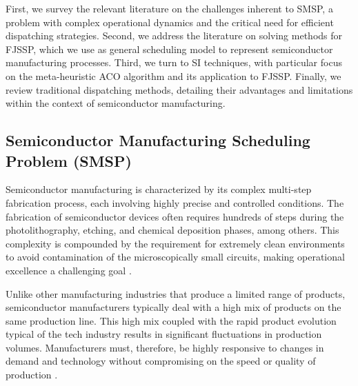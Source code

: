 First, we survey the relevant literature on the challenges inherent to SMSP, a problem with complex operational dynamics and the critical need for efficient dispatching strategies. 
Second, we address the literature on solving methods for FJSSP, which we use as general
scheduling model to represent semiconductor manufacturing processes. %
Third, we turn to SI techniques, with particular focus on the meta-heuristic ACO algorithm and its application to FJSSP.
Finally, we review traditional dispatching methods, detailing their advantages and limitations within the context of semiconductor manufacturing.
\subsection{Semiconductor Manufacturing Scheduling Problem (SMSP)}
Semiconductor manufacturing is characterized by its complex multi-step fabrication process, each involving highly precise and controlled conditions. The fabrication of semiconductor devices often requires hundreds of steps during the photolithography, etching, and chemical deposition phases, among others. This complexity is compounded by the requirement for extremely clean environments to avoid contamination of the microscopically small circuits, making operational excellence a challenging goal \cite{May2006}.

Unlike other manufacturing industries that produce a limited range of products, semiconductor manufacturers typically deal with a high mix of products on the same production line. This high mix coupled with the rapid product evolution typical of the tech industry results in significant fluctuations in production volumes. Manufacturers must, therefore, be highly responsive to changes in demand and technology without compromising on the speed or quality of production .

